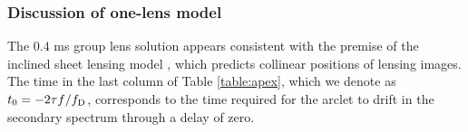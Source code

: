 \documentclass[useAMS,usenatbib]{mn2e}
\begin{document}




\subsubsection{Discussion of one-lens model}
\label{222}
The $0.4$ ms group lens solution appears consistent with the premise
of the inclined sheet lensing model \citep{2014MNRAS.442.3338P}, which
predicts collinear positions of lensing images.  The time in the last
column of Table \ref{table:apex}, which we denote as $t_0
=-2{\tau}f/{f_{\rm D}}$, corresponds to the time required 
for the arclet to drift in the secondary spectrum through a delay of zero.
\end{document}

